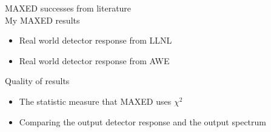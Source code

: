 \documentclass[11pt]{article}
\begin{document}
MAXED successes from literature\\

My MAXED results
\begin{itemize}
\item Real world detector response from LLNL
\item Real world detector response from AWE
\end{itemize}

Quality of results
\begin{itemize}
\item The statistic measure that MAXED uses $\chi^2$
\item Comparing the output detector response and the output spectrum
\end{itemize}
   
   
\end{document}
